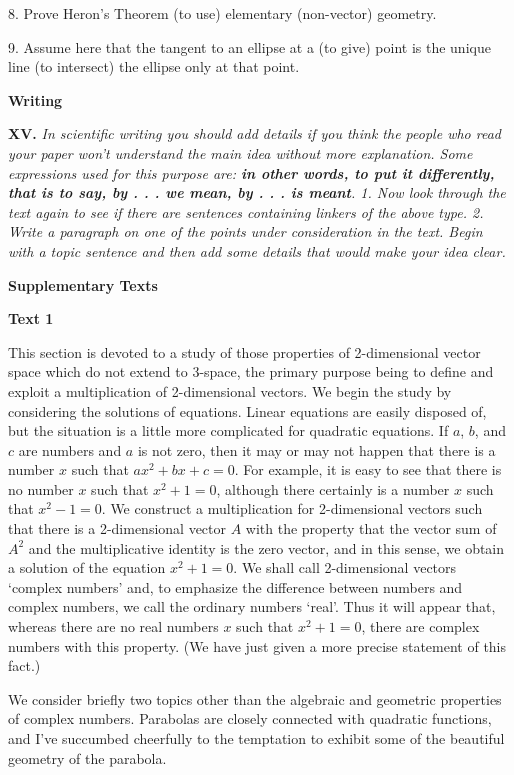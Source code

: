 \documentclass[a4paper]{article}
\newcommand{\ESect}[1]{\medskip\par{\large \textbf{#1}}\par}
\newcommand{\ETask}[2]{\medskip\par\textbf{#1.} \textit{#2}\par}
\begin{document}
8. Prove Heron's Theorem (to use) elementary (non-vector) geometry.

9. Assume here that the tangent to an ellipse at a (to give) point is the unique line (to intersect) the ellipse only at that point.

\ESect{Writing}

\ETask{XV}{In scientific writing you should add details if you think the people who read your paper won't understand the
main idea without more explanation. Some expressions used for this purpose are: \textbf{in other words, to put it differently,
that is to say, by . . . we mean, by . . . is meant}. 1. Now look through the text again to see if there are sentences containing
linkers of the above type. 2. Write a paragraph on one of the points under consideration in the text. Begin with a topic
sentence and then add some details that would make your idea clear.}

\ESect{Supplementary Texts}

\ESect{Text 1}

This section is devoted to a study of those properties of 2-dimensional vector space which do not extend to 3-space,
the primary purpose being to define and exploit a multiplication of 2-dimensional vectors. We begin the study by considering
the solutions of equations. Linear equations are easily disposed of, but the situation is a little more complicated for
quadratic equations. If $a$, $b$, and $c$ are numbers and $a$ is not zero, then it may or may not happen that there is a
number $x$ such that $ax^2+bx+c=0$. For example, it is easy to see that there is no number $x$ such that $x^2+1=0$, although
there certainly is a number $x$ such that $x^2-1=0$. We construct a multiplication for 2-dimensional vectors such that there is
a 2-dimensional vector $A$ with the property that the vector sum of $A^2$ and the multiplicative identity is the zero vector,
and in this sense, we obtain a solution of the equation $x^2+1=0$. We shall call 2-dimensional vectors `complex numbers' and,
to emphasize the difference between numbers and complex numbers, we call the ordinary numbers `real'. Thus it will appear that,
whereas there are no real numbers $x$ such that $x^2+1=0$, there are complex numbers with this property. (We have just given a
more precise statement of this fact.)

We consider briefly two topics other than the algebraic and geometric properties of complex numbers. Parabolas are closely
connected with quadratic functions, and I've succumbed cheerfully to the temptation to exhibit some of the beautiful geometry
of the parabola.
\end{document}
